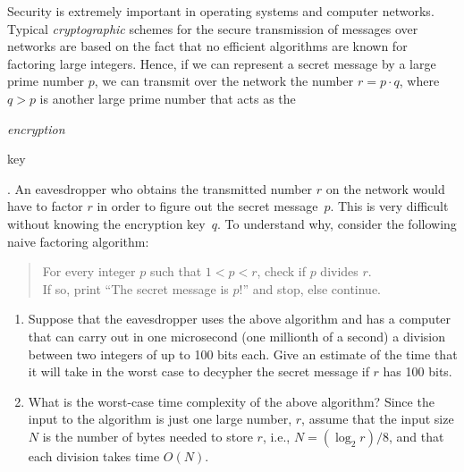 Security is extremely important in operating systems and computer
networks. Typical {\em cryptographic} schemes for the secure
transmission of messages over networks are based on the fact that no
efficient algorithms are known for factoring large integers.  Hence,
if we can represent a secret message by a large prime number $p$, we
can transmit over the network the number $r = p \cdot  q$, where $q >
p$ is another large prime number that acts as the {\em encryption

  key}.  An eavesdropper who obtains the transmitted number $r$ on the
network would have to factor $r$ in order to figure out the secret
message~$p$.  This is very difficult without knowing the encryption
key~$q$.  To understand why, consider the following naive factoring
algorithm:
\begin{quote} \sf
    For every integer $p$ such that $1 < p < r $, check if $p$ divides
  $r$.  \\  If so, print ``The secret message is $p$\/!''  and stop,
  else continue.
\end{quote}
\begin{enumerate}
\item  Suppose that the eavesdropper uses the above algorithm and has a
  computer that can carry out in one microsecond (one millionth of a
  second) a division between two integers of up to 100 bits each.
  Give an estimate of the time that it will take in the worst case to
  decypher the secret message if $r$ has 100 bits.
\item  What is the worst-case time complexity of the above algorithm?
  Since the input to the algorithm is just one large number, $r$,
  assume that the input size $N$ is the number of bytes needed to
  store $r$, i.e., $N = (\log_2  r) /8$, and that each division takes
  time $O(N)$.
\end{enumerate}

